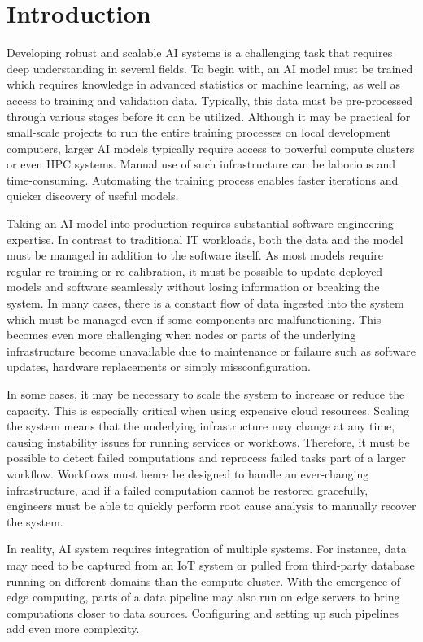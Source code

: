 \documentclass{article}
\begin{document}
\section{Introduction}
Developing robust and scalable AI systems is a challenging task that requires deep understanding in several fields. To begin with, an AI model must be trained which requires knowledge in advanced statistics or machine learning, as well as access to training and validation data. Typically, this data must be pre-processed through various stages before it can be utilized. Although it may be practical for small-scale projects to run the entire training processes on local development computers, larger AI models typically require access to powerful compute clusters or even HPC systems. Manual use of such infrastructure can be laborious and time-consuming. Automating the training process enables faster iterations and quicker discovery of useful models.

Taking an AI model into production requires substantial software engineering expertise. In contrast to traditional IT workloads, both the data and the model must be managed in addition to the software itself. As most models require regular re-training or re-calibration, it must be possible to update deployed models and software seamlessly without losing information or breaking the system. In many cases, there is a constant flow of data ingested into the system which must be managed even if some components are malfunctioning. This becomes even more challenging when nodes or parts of the underlying infrastructure become unavailable due to maintenance or failaure such as software updates, hardware replacements or simply missconfiguration.

In some cases, it may be necessary to scale the system to increase or reduce the capacity. This is especially critical when using expensive cloud resources. Scaling the system means that the underlying infrastructure may change at any time, causing instability issues for running services or workflows. Therefore, it must be possible to detect failed computations and reprocess failed tasks part of a larger workflow. Workflows must hence be designed to handle an ever-changing infrastructure, and if a failed computation cannot be restored gracefully, engineers must be able to quickly perform root cause analysis to manually recover the system.

In reality, AI system requires integration of multiple systems. For instance, data may need to be captured from an IoT system or pulled from third-party database running on different domains than the compute cluster. With the emergence of edge computing, parts of a data pipeline may also run on edge servers to bring computations closer to data sources. Configuring and setting up such pipelines add even more complexity.
\end{document}
